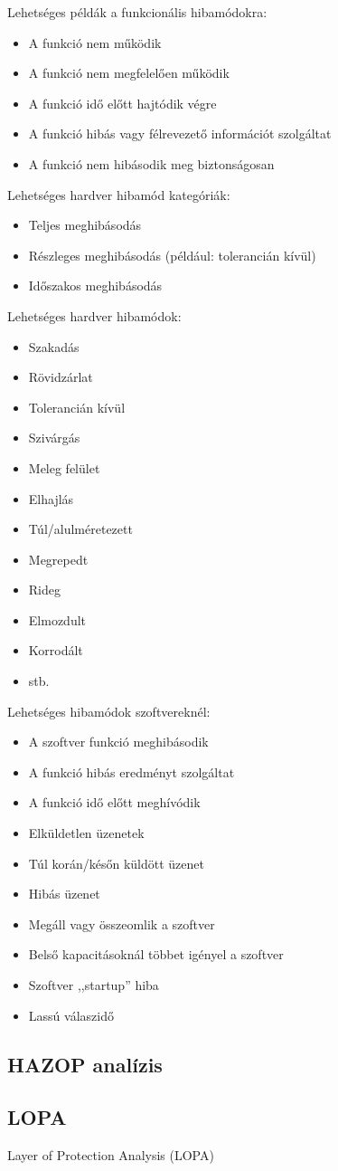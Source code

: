Lehetséges példák a funkcionális hibamódokra:
\begin{itemize}
    \item A funkció nem működik
    \item A funkció nem megfelelően működik
    \item A funkció idő előtt hajtódik végre
    \item A funkció hibás vagy félrevezető információt szolgáltat
    \item A funkció nem hibásodik meg biztonságosan
\end{itemize}
Lehetséges hardver hibamód kategóriák:
\begin{itemize}
    \item Teljes meghibásodás
    \item Részleges meghibásodás (például: tolerancián kívül)
    \item Időszakos meghibásodás
\end{itemize}
Lehetséges hardver hibamódok:
\begin{itemize}
    \item Szakadás
    \item Rövidzárlat
    \item Tolerancián kívül
    \item Szivárgás
    \item Meleg felület
    \item Elhajlás
    \item Túl/alulméretezett
    \item Megrepedt
    \item Rideg
    \item Elmozdult
    \item Korrodált
    \item stb.
\end{itemize}
Lehetséges hibamódok szoftvereknél:
\begin{itemize}
    \item A szoftver funkció meghibásodik
    \item A funkció hibás eredményt szolgáltat
    \item A funkció idő előtt meghívódik
    \item Elküldetlen üzenetek
    \item Túl korán/későn küldött üzenet
    \item Hibás üzenet
    \item Megáll vagy összeomlik a szoftver
    \item Belső kapacitásoknál többet igényel a szoftver
    \item Szoftver ,,startup'' hiba
    \item Lassú válaszidő
\end{itemize}

\subsection{HAZOP analízis}

\subsection{LOPA}
Layer of Protection Analysis (LOPA) \cite{LOPA1}